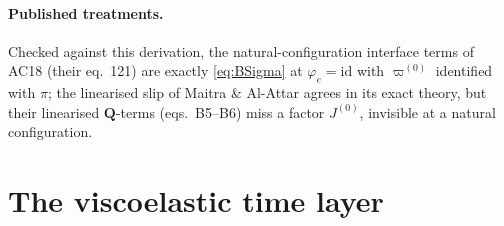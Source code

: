 \documentclass[11pt]{article}
\numberwithin{equation}{section}
\theoremstyle{remark}
\begin{document}
\paragraph{Published treatments.} Checked against this derivation, the
natural-configuration interface terms of AC18 \cite{AC18} (their eq.~121)
are exactly \eqref{eq:BSigma} at $\varphi_e = \mathrm{id}$ with
$\varpi^{(0)}$ identified with $\pi$; the linearised slip of Maitra \&
Al-Attar \cite{MaitraAlAttar2024} agrees in its exact theory, but their
linearised $\mathbf{Q}$-terms (eqs.~B5--B6) miss a factor $J^{(0)}$,
invisible at a natural configuration.

\section{The viscoelastic time layer}
\label{sec:visco}
\end{document}
